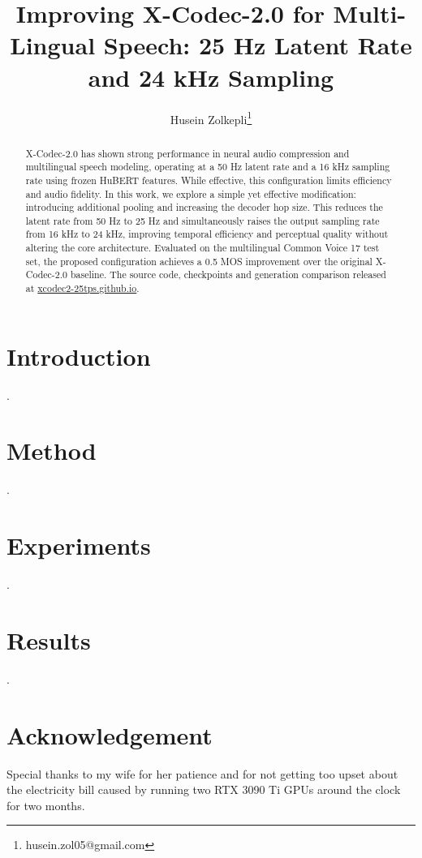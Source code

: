 \documentclass[preprint]{article}
\title{Improving X-Codec-2.0 for Multi-Lingual Speech: 25 Hz Latent Rate and 24 kHz Sampling}
\author{
  Husein Zolkepli\thanks{husein.zol05@gmail.com}
}
\begin{document}
\maketitle

\begin{abstract}

X-Codec-2.0 has shown strong performance in neural audio compression and multilingual speech modeling, operating at a 50 Hz latent rate and a 16 kHz sampling rate using frozen HuBERT features. While effective, this configuration limits efficiency and audio fidelity.
In this work, we explore a simple yet effective modification: introducing additional pooling and increasing the decoder hop size. This reduces the latent rate from 50 Hz to 25 Hz and simultaneously raises the output sampling rate from 16 kHz to 24 kHz, improving temporal efficiency and perceptual quality without altering the core architecture.
Evaluated on the multilingual Common Voice 17 test set, the proposed configuration achieves a 0.5 MOS improvement over the original X-Codec-2.0 baseline. The source code, checkpoints and generation comparison released at \href{https://xcodec2-25tps.github.io}{xcodec2-25tps.github.io}.

\end{abstract}

\section{Introduction}

.

\section{Method}

.

\section{Experiments}

.

\section{Results}

.

\section{Acknowledgement}

Special thanks to my wife for her patience and for not getting too upset about the electricity bill
caused by running two RTX 3090 Ti GPUs around the clock for two months.

{}

\end{document}
